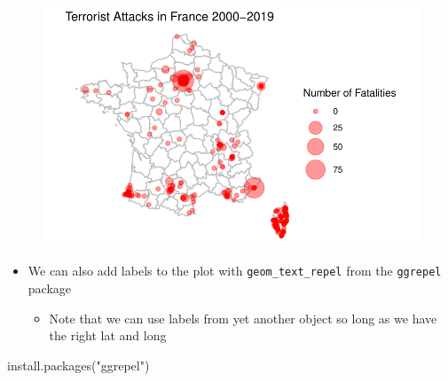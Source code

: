 \documentclass[
  letterpaper,
  DIV=11,
  numbers=noendperiod]{scrreprt}
\newenvironment{Shaded}{\begin{snugshade}}{\end{snugshade}}
\newcommand{\FunctionTok}[1]{\textcolor[rgb]{0.28,0.35,0.67}{#1}}
\newcommand{\NormalTok}[1]{\textcolor[rgb]{0.00,0.23,0.31}{#1}}
\newcommand{\StringTok}[1]{\textcolor[rgb]{0.13,0.47,0.30}{#1}}
\providecommand{\tightlist}{%
  \setlength{\itemsep}{0pt}\setlength{\parskip}{0pt}}\usepackage{longtable,booktabs,array}
\begin{document}
\begin{figure}[H]

{\centering \includegraphics{12-Maps_files/figure-pdf/unnamed-chunk-25-1.pdf}

}

\end{figure}

\begin{itemize}
\tightlist
\item
  We can also add labels to the plot with \texttt{geom\_text\_repel}
  from the \texttt{ggrepel} package

  \begin{itemize}
  \tightlist
  \item
    Note that we can use labels from yet another object so long as we
    have the right lat and long
  \end{itemize}
\end{itemize}

\begin{Shaded}
\begin{Highlighting}[]
\FunctionTok{install.packages}\NormalTok{(}\StringTok{"ggrepel"}\NormalTok{)}
\end{Highlighting}
\end{Shaded}
\end{document}
